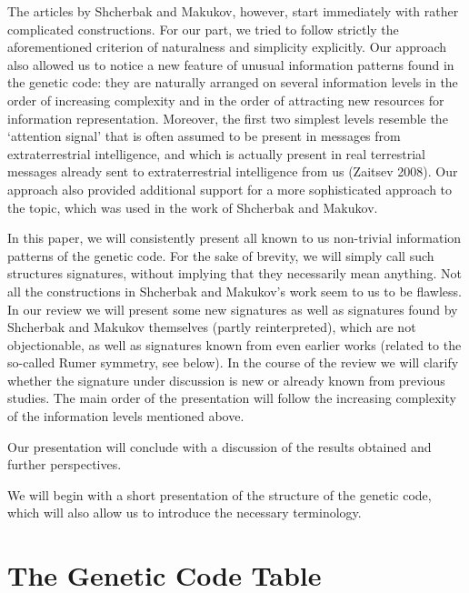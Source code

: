 \documentclass[12pt]{article}
\begin{document}
The articles by Shcherbak and Makukov, however, start immediately with rather complicated constructions. For our part, we tried to follow strictly the aforementioned criterion of naturalness and simplicity explicitly. Our approach also allowed us to notice a new feature of unusual information patterns found in the genetic code: they are naturally arranged on several information levels in the order of increasing complexity and in the order of attracting new resources for information representation. Moreover, the first two simplest levels resemble the `attention signal' that is often assumed to be present in messages from extraterrestrial intelligence, and which is actually present in real terrestrial messages already sent to extraterrestrial intelligence from us (Zaitsev 2008). Our approach also provided additional support for a more sophisticated approach to the topic, which was used in the work of Shcherbak and Makukov.

In this paper, we will consistently present all known to us non-trivial information patterns of the genetic code. For the sake of brevity, we will simply call such structures signatures, without implying that they necessarily mean anything. Not all the constructions in Shcherbak and Makukov's work seem to us to be flawless. In our review we will present some new signatures as well as signatures found by Shcherbak and Makukov themselves (partly reinterpreted), which are not objectionable, as well as signatures known from even earlier works (related to the so-called Rumer symmetry, see below). In the course of the review we will clarify whether the signature under discussion is new or already known from previous studies. The main order of the presentation will follow the increasing complexity of the information levels mentioned above.

Our presentation will conclude with a discussion of the results obtained and further perspectives.

We will begin with a short presentation of the structure of the genetic code, which will also allow us to introduce the necessary terminology.

\section{The Genetic Code Table}
\end{document}
